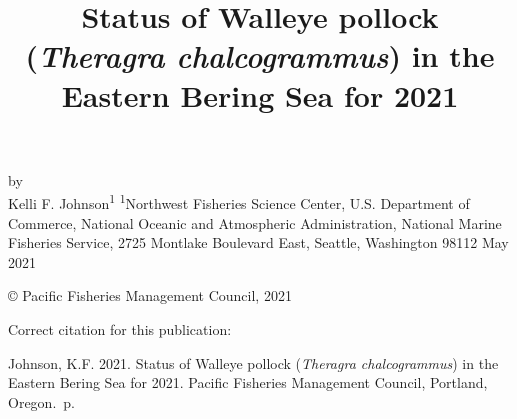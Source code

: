 \documentclass[11pt,
  english,
  a4paper,
]{article}
\date{}
\newcommand{\trTitle}{Status of Walleye pollock (\emph{Theragra chalcogrammus}) in the Eastern Bering Sea for 2021}
\newcommand{\trYear}{2021}
\newcommand{\trMonth}{May}
\newcommand{\trAuthsBack}{Johnson, K.F}
\newcommand{\trCitation}{
\begin{hangparas}{1em}{1}
\trAuthsBack{}. \trYear{}. \trTitle{}. Pacific Fisheries Management Council, Portland, Oregon. \pageref{LastPage}{}\,p.
\end{hangparas}}
\begin{document}

\renewcommand*{\thefootnote}{\fnsymbol{footnote}}

\small
\thispagestyle{empty}
\noindent
\begin{center}
\title{Status of Walleye pollock (\emph{Theragra chalcogrammus}) in the Eastern Bering Sea for 2021}
\vspace{1.5cm}
{\Large\textbf{}}
\vfill
by\\
Kelli F. Johnson\textsuperscript{1}\vfill
\textsuperscript{1}Northwest Fisheries Science Center, U.S. Department of Commerce, National Oceanic and Atmospheric Administration, National Marine Fisheries Service, 2725 Montlake Boulevard East, Seattle, Washington 98112\vfill
\trMonth{} \trYear{}
\end{center}
\clearpage

\thispagestyle{empty}
\vspace*{\fill}
\begin{center}
\copyright{} Pacific Fisheries Management Council, \trYear{}\\
\end{center}
\par
\bigskip
\noindent
Correct citation for this publication:
\bigskip
\par
\trCitation{}
\clearpage


\tableofcontents\clearpage
\listoffigures \listoftables \clearpage
\label{TRlastRoman}
\clearpage

\newpage
\thispagestyle{empty} %

\pagestyle{plain}  %
\renewcommand*{\thefootnote}{\arabic{footnote}}  %
\setcounter{footnote}{0}  %
\renewcommand{\headrulewidth}{0.5pt}
\renewcommand{\footrulewidth}{0.5pt}

\newcommand{\lt}{\ensuremath <}
\newcommand{\gt}{\ensuremath >}
\end{document}
